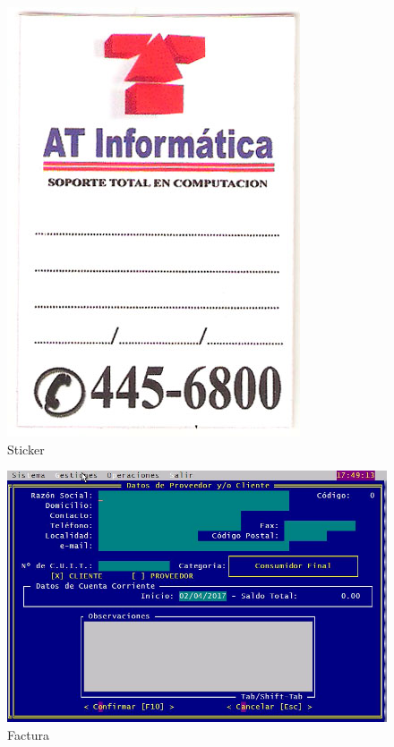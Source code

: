 \documentclass[12pt]{extarticle}
\begin{document}
    \begin{figure}[h]
    \includegraphics[scale=0.275]{images/atinformatica-sticker.jpg}
    \caption{Sticker}
    \end{figure}


    \begin{figure}[h]
    \includegraphics[scale=0.5]{images/cliente_ingreso.jpg}
    \caption{Factura}
    \end{figure}
\end{document}
